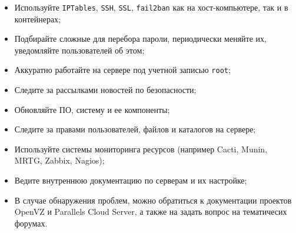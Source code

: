 \begin{itemize}
    \item Используйте \texttt{IPTables}, \texttt{SSH}, \texttt{SSL}, \texttt{fail2ban} как на хост-компьютере, так и в контейнерах;
    \item Подбирайте сложные для перебора пароли, периодически меняйте их, уведомляйте пользователей об этом;
    \item Аккуратно работайте на сервере под учетной записью \texttt{root};
    \item Следите за рассылками новостей по безопасности;
    \item Обновляйте ПО, систему и ее компоненты;
    \item Следите за правами пользователей, файлов и каталогов на сервере;
    \item Используйте системы мониторинга ресурсов (например Cacti, Munin, MRTG, Zabbix, Nagios);
    \item Ведите внутреннюю документацию по серверам и их настройке;
    \item В случае обнаружения проблем, можно обратиться к документации проектов OpenVZ и Parallels Cloud Server, а также на задать вопрос на тематичесих форумах.
\end{itemize}

\clearpage
